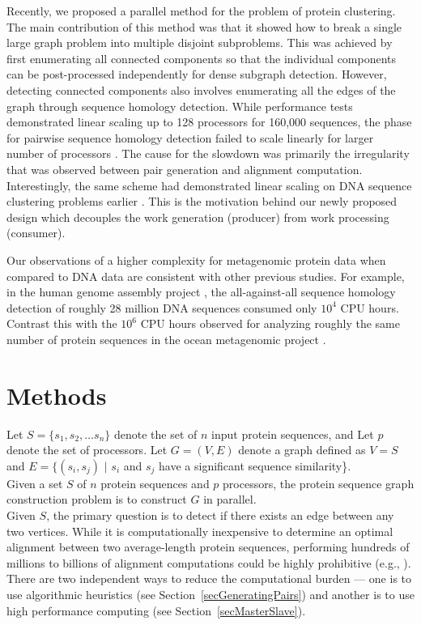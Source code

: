 \documentclass[10pt,journal,letterpaper,compsoc]{IEEEtran}
\begin{document}
Recently, we proposed a parallel method \cite{Wu08} for the problem of protein clustering. The main contribution of this method was that it showed how to break a single large graph problem into multiple disjoint subproblems. This was achieved by first enumerating all connected components so that the individual components can be post-processed independently for dense subgraph detection. However, detecting connected components also involves enumerating all the edges of the graph through sequence homology detection. While performance tests demonstrated linear scaling up to 128 processors for 160,000 sequences, the phase for pairwise sequence homology detection failed to scale linearly for larger number of processors \cite{Wu08}. The cause for the slowdown was primarily the irregularity that was observed between pair generation and alignment computation. Interestingly, the same scheme had demonstrated linear scaling on DNA sequence clustering problems earlier \cite{Kalyanaraman07}. This is the motivation behind our newly proposed design which decouples the work generation (producer) from work processing (consumer).

Our observations of a higher complexity for metagenomic protein data when compared to DNA data are consistent with other previous studies. For example, in the human genome assembly project \cite{Venter01}, the all-against-all sequence homology detection of roughly 28 million DNA sequences consumed only $10^4$ CPU hours. Contrast this with the $10^6$ CPU hours observed for analyzing roughly the same number of protein sequences in the ocean metagenomic project \cite{Yooseph07}.


\section{Methods}
\label{secMethods}

 Let $S=\{s_1,s_2,\ldots s_n\}$ denote the set of $n$ input protein sequences, and Let $p$ denote the set of processors. Let $G=(V,E)$ denote a graph defined as $V=S$ and $E=\{(s_i,s_j)$ $|$ $s_i$ and $s_j$ have a significant sequence similarity\}.\\

 Given a set $S$ of $n$ protein sequences and $p$ processors, the protein sequence graph construction problem is to construct $G$ in parallel.\\

Given $S$, the primary question is to detect if there exists an edge between any two vertices. While it is computationally inexpensive to determine an optimal alignment between two average-length protein sequences, performing hundreds of millions to billions of alignment computations could be highly prohibitive (e.g., \cite{Wu08, Yooseph07}).  There are two independent ways to reduce the computational burden --- one is to use algorithmic heuristics (see Section~\ref{secGeneratingPairs}) and another is to use high performance computing (see Section~\ref{secMasterSlave}).
\end{document}
